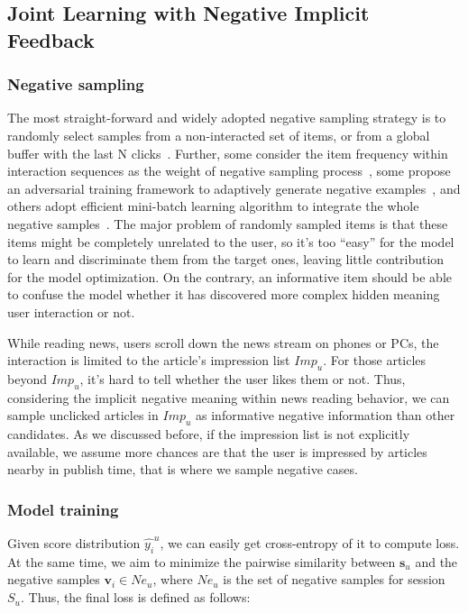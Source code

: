 \subsection{Joint Learning with Negative Implicit Feedback}
\label{sec:negative feedback}
\subsubsection{Negative sampling}
The most straight-forward and widely adopted negative sampling strategy is to randomly select samples from a non-interacted set of items, or from a global buffer with the last N clicks~\cite{moreira_news_2018}. Further, some consider the item frequency within interaction sequences as the weight of negative sampling process~\cite{li_learning_2018}, some propose an adversarial training framework to adaptively generate negative examples~\cite{wang_neural_2018}, and others adopt efficient mini-batch learning algorithm to integrate the whole negative samples~\cite{chen2020efficient}.
The major problem of randomly sampled items is that these items might be completely unrelated to the user, so it's too ``easy'' for the model to learn and discriminate them from the target ones, leaving little contribution for the model optimization. On the contrary, an informative item should be able to confuse the model whether it has discovered more complex hidden meaning user interaction or not.

While reading news, users scroll down the news stream on phones or PCs, the interaction is limited to the article's impression list $Imp_u$. 
For those articles beyond $Imp_u$, it's hard to tell whether the user likes them or not. Thus, considering the implicit negative meaning within news reading behavior, we can sample unclicked articles in $Imp_u$ as informative negative information than other candidates. As we discussed before, if the impression list is not 
explicitly available, we assume more chances are that the user is impressed by  articles nearby in publish time, that is where we sample negative cases.

\subsubsection{Model training}
Given score distribution $\hat{y_i}^u$, we can easily get cross-entropy of it to compute loss. At the same time, we aim to minimize the pairwise similarity between $\mathbf{s}_u$ and the negative samples $\mathbf{v}_i\in Ne_u$, where $Ne_u$ is the set of negative samples for session $S_u$. Thus, the final loss is defined as follows: 

